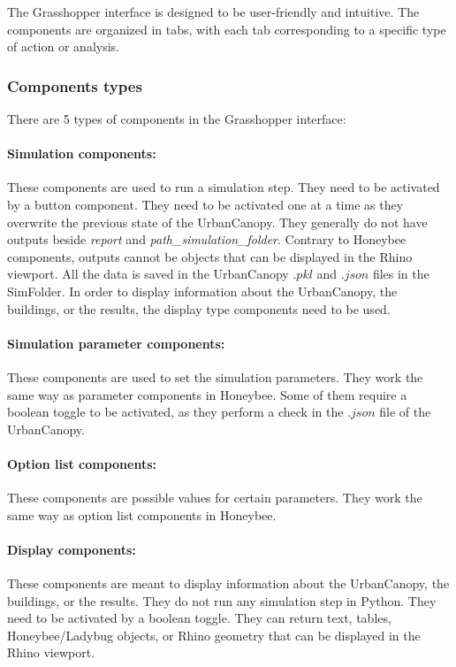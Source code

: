 \documentclass[a4paper,12pt]{article} %
\begin{document}
    The Grasshopper interface is designed to be user-friendly and intuitive.
    The components are organized in tabs, with each tab corresponding to a specific type of action or analysis.

    \subsubsection{Components types}
    \label{subsubsec:components-types}
    There are 5 types of components in the Grasshopper interface:
    \paragraph{Simulation components:} These components are used to run a simulation step.
    They need to be activated by a button component.
    They need to be activated one at a time as they overwrite the previous state of the \gls{UrbanCanopy}.
    They generally do not have outputs beside \textit{report} and \textit{path\_simulation\_folder}.
    Contrary to Honeybee components, outputs cannot be objects that can be displayed in the Rhino viewport.
    All the data is saved in the \gls{UrbanCanopy} $.pkl$ and $.json$ files in the \gls{SimFolder}.
    In order to display information about the \gls{UrbanCanopy}, the buildings, or the results, the display type components need to be used.

    \paragraph{Simulation parameter components:} These components are used to set the simulation parameters.
    They work the same way as parameter components in Honeybee.
    Some of them require a boolean toggle to be activated, as they perform a check in the $.json$ file of the \gls{UrbanCanopy}.

    \paragraph{Option list components:} These components are possible values for certain parameters.
    They work the same way as option list components in Honeybee.

    \paragraph{Display components:} These components are meant to display information about the \gls{UrbanCanopy}, the buildings, or the results.
    They do not run any simulation step in Python.
    They need to be activated by a boolean toggle.
    They can return text, tables, Honeybee/Ladybug objects, or Rhino geometry that can be displayed in the Rhino viewport.
\end{document}
